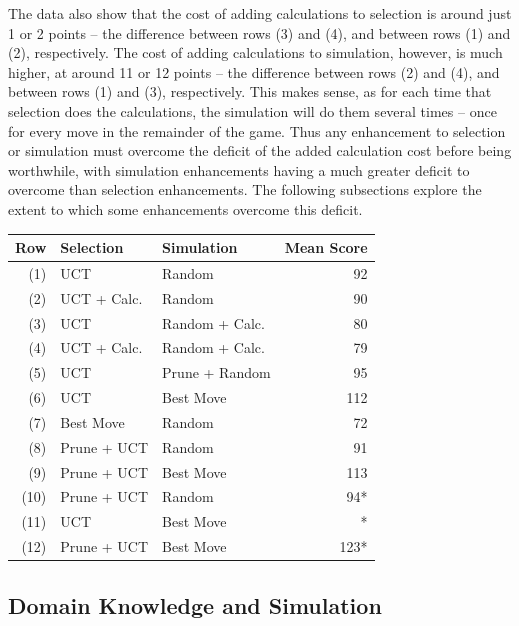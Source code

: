 \documentclass[letterpaper]{article}
\begin{document}
The data also show that the cost of adding calculations to selection is around just 1 or 2 points -- the difference between rows (3) and (4), and between rows (1) and (2), respectively. The cost of adding calculations to simulation, however, is much higher, at around 11 or 12 points -- the difference between rows (2) and (4), and between rows (1) and (3), respectively. This makes sense, as for each time that selection does the calculations, the simulation will do them several times -- once for every move in the remainder of the game. Thus any enhancement to selection or simulation must overcome the deficit of the added calculation cost before being worthwhile, with simulation enhancements having a much greater deficit to overcome than selection enhancements. The following subsections explore the extent to which some enhancements overcome this deficit.

\begin{table}
\label{tbl:SelSim}
\centering
\begin{tabular}{r l l r}
\hline
{\centering\bf Row} & {\centering\bf Selection} & {\centering\bf Simulation} & {\centering\bf Mean Score} \\
\hline
\hline
(1) & UCT & Random & 92 \\
(2) & UCT + Calc. & Random & 90 \\
(3) & UCT & Random + Calc. & 80 \\
(4) & UCT + Calc. & Random + Calc. & 79 \\
\hline
(5) & UCT & Prune + Random & 95 \\
(6) & UCT & Best Move & 112 \\
\hline
(7) & Best Move & Random & 72 \\
(8) & Prune + UCT & Random & 91 \\
\hline
(9) & Prune + UCT & Best Move & 113 \\
\hline
(10) & Prune + UCT & Random & 94\mbox{*}  \\
(11) & UCT & Best Move & \mbox{*} \\
(12) & Prune + UCT & Best Move & 123\mbox{*}  \\
\end{tabular}
\end{table}

\subsection{Domain Knowledge and Simulation}
\end{document}
